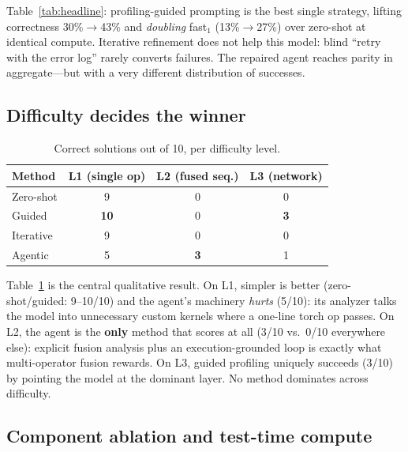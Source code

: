 \documentclass[conference]{IEEEtran}
\begin{document}
Table~\ref{tab:headline}: profiling-guided prompting is the best single strategy,
lifting correctness 30\%$\to$43\% and \emph{doubling} fast$_1$ (13\%$\to$27\%) over
zero-shot at identical compute. Iterative refinement does not help this model:
blind ``retry with the error log'' rarely converts failures. The repaired agent
reaches parity in aggregate---but with a very different distribution of successes.

\subsection{Difficulty decides the winner}

\begin{table}[t]
\caption{Correct solutions out of 10, per difficulty level.}
\label{tab:levels}
\centering
\begin{tabular}{lccc}
\toprule
Method & L1 (single op) & L2 (fused seq.) & L3 (network) \\
\midrule
Zero-shot & 9 & 0 & 0 \\
Guided    & \textbf{10} & 0 & \textbf{3} \\
Iterative & 9 & 0 & 0 \\
Agentic   & 5 & \textbf{3} & 1 \\
\bottomrule
\end{tabular}
\end{table}

Table~\ref{tab:levels} is the central qualitative result. On L1, simpler is better
(zero-shot/guided: 9--10/10) and the agent's machinery \emph{hurts} (5/10): its
analyzer talks the model into unnecessary custom kernels where a one-line torch op
passes. On L2, the agent is the \textbf{only} method that scores at all (3/10 vs.\
0/10 everywhere else): explicit fusion analysis plus an execution-grounded loop is
exactly what multi-operator fusion rewards. On L3, guided profiling uniquely
succeeds (3/10) by pointing the model at the dominant layer. No method dominates
across difficulty.

\subsection{Component ablation and test-time compute}\label{sec:ablation}
\end{document}

